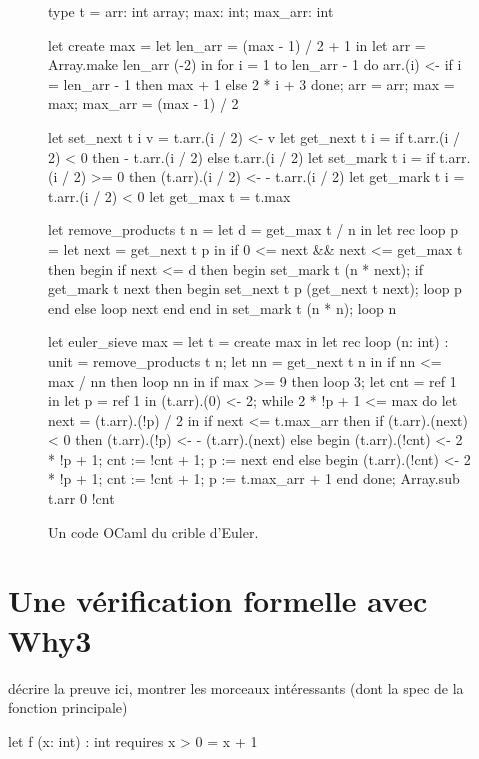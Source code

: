\documentclass[a4paper]{easychair}
\begin{document}
\begin{figure}[tp]
\begin{ocaml}
type t = { arr: int array; max: int; max_arr: int }

let create max =
  let len_arr = (max - 1) / 2 + 1 in
  let arr = Array.make len_arr (-2) in
  for i = 1 to len_arr - 1 do
    arr.(i) <- if i = len_arr - 1 then max + 1 else 2 * i + 3
  done;
  { arr = arr; max = max; max_arr = (max - 1) / 2 }

let set_next t i v = t.arr.(i / 2) <- v
let get_next t i = if t.arr.(i / 2) < 0 then - t.arr.(i / 2) else t.arr.(i / 2)
let set_mark t i = if t.arr.(i / 2) >= 0 then (t.arr).(i / 2) <- - t.arr.(i / 2)
let get_mark t i = t.arr.(i / 2) < 0
let get_max t = t.max

let remove_products t n =
  let d = get_max t / n in
  let rec loop p =
    let next = get_next t p in
    if 0 <= next && next <= get_max t then begin
      if next <= d then begin
        set_mark t (n * next);
        if get_mark t next then begin set_next t p (get_next t next); loop p end
        else loop next
      end end in
  set_mark t (n * n); loop n

let euler_sieve max =
  let t = create max in
  let rec loop (n: int) : unit =
    remove_products t n;
    let nn = get_next t n in
    if nn <= max / nn then loop nn in
  if max >= 9 then loop 3;
  let cnt = ref 1 in
  let p = ref 1 in (t.arr).(0) <- 2;
  while 2 * !p + 1 <= max do
    let next = (t.arr).(!p) / 2 in
    if next <= t.max_arr then
      if (t.arr).(next) < 0 then (t.arr).(!p) <- - (t.arr).(next)
      else begin (t.arr).(!cnt) <- 2 * !p + 1; cnt := !cnt + 1; p := next end
    else begin (t.arr).(!cnt) <- 2 * !p + 1; cnt := !cnt + 1; p := t.max_arr + 1 end
  done;
  Array.sub t.arr 0 !cnt
\end{ocaml}
\caption{Un code OCaml du crible d'Euler.}
\label{fig:codeOCaml}
\end{figure}

\section{Une vérification formelle avec Why3}

décrire la preuve ici, montrer les morceaux intéressants
(dont la spec de la fonction principale)

\begin{why3}
  let f (x: int) : int
    requires { x > 0 }
  =
    x + 1
\end{why3}
\end{document}
